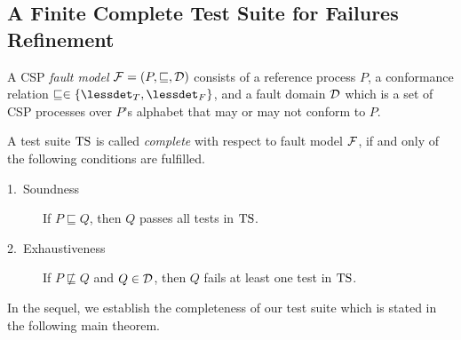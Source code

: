 

\subsection{A Finite Complete Test Suite for Failures Refinement}


A CSP \emph{fault model} ${\cal F} = (P,\sqsubseteq,{\cal D})$ consists of a
reference process $P$, a conformance relation $\sqsubseteq \in \{\lessdet_T,
\lessdet_F\}$, and a fault domain ${\cal D}$ which is a set of CSP processes
over $P$'s alphabet that may or may not conform to $P$.

A test suite ${\text{TS}}$ is called \emph{complete} with respect to fault model ${\cal F}$,
if and only of the following conditions are fulfilled.
\begin{description}
\item[1.~Soundness] If $P \sqsubseteq Q$, then $Q$ passes all tests in ${\text{TS}}$.
\item[2.~Exhaustiveness] If $P \not\sqsubseteq Q$ and $Q\in{\cal D}$,
then $Q$ fails at least one test in ${\text{TS}}$.
\end{description}
%
In the sequel, we establish the completeness of our test suite which is stated 
in the following main theorem.

